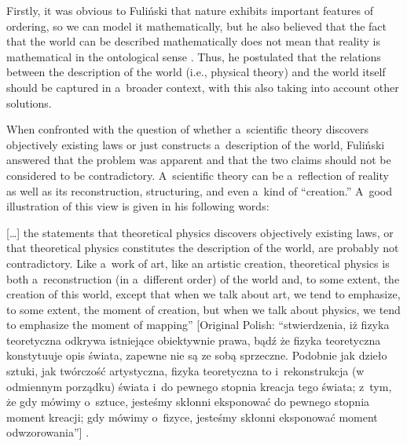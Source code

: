 Firstly, it was obvious to Fuliński that nature exhibits important features of ordering, so we can model it mathematically, but he also believed that the fact that the world can be described mathematically does not mean that reality is mathematical in the ontological sense 
\parencites[][]{janik_glos_1988}[][]{janik_glos_1990}[][]{fulinski_o_1993}. %
 Thus, he postulated that the relations between the description of the world (i.e., physical theory) and the world itself should be captured in a~broader context, with this also taking into account other solutions.



When confronted with the question of whether a~scientific theory discovers objectively existing laws or just constructs a~description of the world, Fuliński answered that the problem was apparent and that the two claims should not be considered to be contradictory. A~scientific theory can be a~reflection of reality as well as its reconstruction, structuring, and even a~kind of ``creation.'' A~good illustration of this view is given in his following words:



[…] the statements that theoretical physics discovers objectively existing laws, or that theoretical physics constitutes the description of the world, are probably not contradictory. Like a~work of art, like an artistic creation, theoretical physics is both a~reconstruction (in a~different order) of the world and, to some extent, the creation of this world, except that when we talk about art, we tend to emphasize, to some extent, the moment of creation, but when we talk about physics, we tend to emphasize the moment of mapping'' [Original Polish: ``stwierdzenia, iż fizyka teoretyczna odkrywa istniejące obiektywnie prawa, bądź że fizyka teoretyczna konstytuuje opis świata, zapewne nie są ze sobą sprzeczne. Podobnie jak dzieło sztuki, jak twórczość artystyczna, fizyka teoretyczna to i~rekonstrukcja (w odmiennym porządku) świata i~do pewnego stopnia kreacja tego świata; z~tym, że gdy mówimy o~sztuce, jesteśmy skłonni eksponować do pewnego stopnia moment kreacji; gdy mówimy o~fizyce, jesteśmy skłonni eksponować moment odwzorowania''] 
\parencite[][p.221]{janik_o_1988}.%





